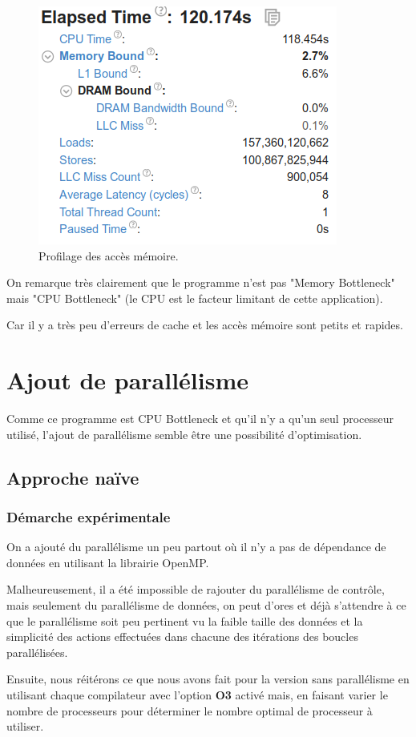 \documentclass[
 aip,
 jmp,
 amsmath,amssymb,
 reprint
]{revtex4-1}
\begin{document}
\begin{figure}[H]
  \includegraphics[width=\linewidth, keepaspectratio=true]{memory_vtune.png}
  \caption{Profilage des accès mémoire.\label{Fig:vTune_sequentiel_mem}}
\end{figure}

On remarque très clairement que le programme n'est pas "Memory Bottleneck" mais "CPU Bottleneck" (le CPU est le facteur limitant de cette application).\par
Car il y a très peu d'erreurs de cache et les accès mémoire sont petits et rapides.

\section{Ajout de parallélisme}

Comme ce programme est CPU Bottleneck et qu'il n'y a qu'un seul processeur utilisé, l'ajout de parallélisme semble être une possibilité d'optimisation.

\subsection{Approche naïve}

\subsubsection{Démarche expérimentale}

On a ajouté du parallélisme un peu partout où il n'y a pas de dépendance de données en utilisant la librairie OpenMP.\par
Malheureusement, il a été impossible de rajouter du parallélisme de contrôle, mais seulement du parallélisme de données, on peut d'ores et déjà s'attendre à ce que le parallélisme soit peu pertinent vu la faible taille des données et la simplicité des actions effectuées dans chacune des itérations des boucles parallélisées.\par
Ensuite, nous réitérons ce que nous avons fait pour la version sans parallélisme en utilisant chaque compilateur avec l'option \textbf{O3} activé mais, en faisant varier le nombre de processeurs pour déterminer le nombre optimal de processeur à utiliser.
\end{document}
